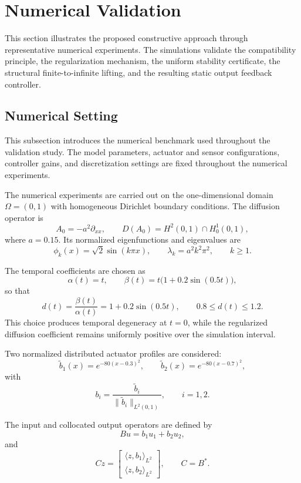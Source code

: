 \documentclass[pdflatex,sn-mathphys-num]{sn-jnl}
\theoremstyle{thmstyleone}%
\theoremstyle{thmstyletwo}%
\theoremstyle{thmstylethree}%
\begin{document}
\section{Numerical Validation}
\label{sec:numerics}

This section illustrates the proposed constructive approach through representative numerical experiments. The simulations validate the compatibility principle, the regularization mechanism, the uniform stability certificate, the structural finite-to-infinite lifting, and the resulting static output feedback controller.

\subsection{Numerical Setting}
\label{subsec:numerical-setting}

This subsection introduces the numerical benchmark used throughout the validation study. The model parameters, actuator and sensor configurations, controller gains, and discretization settings are fixed throughout the numerical experiments.

The numerical experiments are carried out on the one-dimensional domain \(\Omega=(0,1)\) with homogeneous Dirichlet boundary conditions. The diffusion operator is
\[
A_0=-a^2\partial_{xx},
\qquad
D(A_0)=H^2(0,1)\cap H_0^1(0,1),
\]
where \(a=0.15\). Its normalized eigenfunctions and eigenvalues are
\[
\phi_k(x)=\sqrt{2}\sin(k\pi x),
\qquad
\lambda_k=a^2k^2\pi^2,
\qquad
k\ge1.
\]

The temporal coefficients are chosen as
\[
\alpha(t)=t,
\qquad
\beta(t)=t\bigl(1+0.2\sin(0.5t)\bigr),
\]
so that
\[
d(t)
=
\frac{\beta(t)}{\alpha(t)}
=
1+0.2\sin(0.5t),
\qquad
0.8\le d(t)\le1.2.
\]
This choice produces temporal degeneracy at \(t=0\), while the regularized diffusion coefficient remains uniformly positive over the simulation interval.

Two normalized distributed actuator profiles are considered:
\[
\widetilde b_1(x)=e^{-80(x-0.3)^2},
\qquad
\widetilde b_2(x)=e^{-80(x-0.7)^2},
\]
with
\[
b_i
=
\frac{\widetilde b_i}
{\|\widetilde b_i\|_{L^2(0,1)}},
\qquad
i=1,2.
\]

The input and collocated output operators are defined by
\[
Bu=b_1u_1+b_2u_2,
\]
and
\[
Cz=
\begin{bmatrix}
\langle z,b_1\rangle_{L^2}\\
\langle z,b_2\rangle_{L^2}
\end{bmatrix},
\qquad
C=B^\ast.
\]
\end{document}
